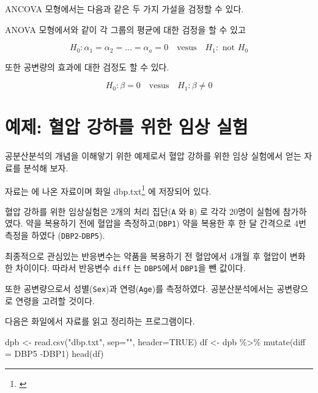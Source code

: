 \documentclass[
]{book}
\newenvironment{Shaded}{\begin{snugshade}}{\end{snugshade}}
\newcommand{\AttributeTok}[1]{\textcolor[rgb]{0.77,0.63,0.00}{#1}}
\newcommand{\ConstantTok}[1]{\textcolor[rgb]{0.00,0.00,0.00}{#1}}
\newcommand{\FunctionTok}[1]{\textcolor[rgb]{0.00,0.00,0.00}{#1}}
\newcommand{\NormalTok}[1]{#1}
\newcommand{\OtherTok}[1]{\textcolor[rgb]{0.56,0.35,0.01}{#1}}
\newcommand{\SpecialCharTok}[1]{\textcolor[rgb]{0.00,0.00,0.00}{#1}}
\newcommand{\StringTok}[1]{\textcolor[rgb]{0.31,0.60,0.02}{#1}}
\renewcommand{\href}[2]{#2\footnote{\url{#1}}}
\begin{document}
ANCOVA 모형에서는 다음과 같은 두 가지 가설을 검정할 수 있다.

ANOVA 모형에서와 같이 각 그룹의 평균에 대한 검정을 할 수 있고

\begin{equation*}
H_0: \alpha_1 = \alpha_2 =...=\alpha_a =0  \quad \text{vesus} \quad H_1: \text{ not } H_0 
\end{equation*}

또한 공변량의 효과에 대한 검정도 할 수 있다.

\begin{equation} 
H_0: \beta =0  \quad \text{vesus} \quad H_1: \beta \ne 0 
\label{eq:hypoancova}
\end{equation}

\hypertarget{uxc608uxc81c-uxd608uxc555-uxac15uxd558uxb97c-uxc704uxd55c-uxc784uxc0c1-uxc2e4uxd5d8}{%
\section{예제: 혈압 강하를 위한 임상 실험}\label{uxc608uxc81c-uxd608uxc555-uxac15uxd558uxb97c-uxc704uxd55c-uxc784uxc0c1-uxc2e4uxd5d8}}

공분산분석의 개념을 이해앟기 위한 예제로서 혈압 강하를 위한 임상 실험에서 얻는 자료를 분석해 보자.

자료는 \citep{chen2017clinical} 에 나온 자료이며 화일 \href{}{dbp.txt} 에 저장되어 있다.

혈압 강하를 위한 임상실험은 2개의 처리 집단(\texttt{A} 와 \texttt{B}) 로 각각 20명이 실험에 참가하였다. 약을 복용하기 전에 혈압을 측정하고(\texttt{DBP1}) 약을 복용한 후 한 달 간격으로 4번 측정을 하였다 (\texttt{DBP2}-\texttt{DBP5}).

최종적으로 관심있는 반응변수는 약품을 복용하기 전 혈압에서 4개월 후 혈압이 변화한 차이이다.
따라서 반응변수 \texttt{diff} 는 \texttt{DBP5}에서 \texttt{DBP1}을 뺀 값이다.

또한 공변량으로서 성별(\texttt{Sex})과 연령(\texttt{Age})를 측정하였다. 공분산분석에서는 공변량으로 연령을 고려할 것이다.

다음은 화일에서 자료를 읽고 정리하는 프로그램이다.

\begin{Shaded}
\begin{Highlighting}[]
\NormalTok{dpb }\OtherTok{\textless{}{-}} \FunctionTok{read.csv}\NormalTok{(}\StringTok{"dbp.txt"}\NormalTok{, }\AttributeTok{sep=}\StringTok{""}\NormalTok{, }\AttributeTok{header=}\ConstantTok{TRUE}\NormalTok{)}
\NormalTok{df }\OtherTok{\textless{}{-}}\NormalTok{ dpb }\SpecialCharTok{\%\textgreater{}\%} \FunctionTok{mutate}\NormalTok{(}\AttributeTok{diff =}\NormalTok{ DBP5 }\SpecialCharTok{{-}}\NormalTok{DBP1)}
\FunctionTok{head}\NormalTok{(df)}
\end{Highlighting}
\end{Shaded}
\end{document}
